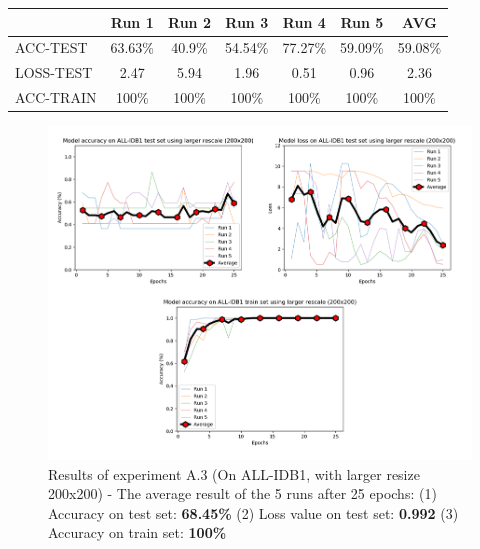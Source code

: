 \documentclass[11pt, openany]{report}
\theoremstyle{plain}
\theoremstyle{definition}
\theoremstyle{remark}
\begin{document}
\newpage
\begin{center}
\begin{tabular}{|l|c|c|c|c|c|c|}
  \hline
   & \textbf{Run 1} & \textbf{Run 2} & \textbf{Run 3} & \textbf{Run 4} & \textbf{Run 5} & \textbf{AVG}\\
  \hline
  ACC-TEST & 63.63\% & 40.9\% & 54.54\% & 77.27\% & 59.09\% & 59.08\%\\
  LOSS-TEST & 2.47 & 5.94 & 1.96 & 0.51  & 0.96 & 2.36 \\ 
  ACC-TRAIN & 100\% & 100\% & 100\% & 100\% & 100\% & 100\% \\ 
  \hline
\end{tabular}
\label{table:results-A3}
\end{center}

\begin{figure}[H]
  \centering
  \includegraphics[scale=0.5]{Code/ch6-LeukemiaSubtypes/figures_result/ALL_IDB1/all_idb1-200x200.PNG}
  \caption{Results of experiment A.3 (On ALL-IDB1, with larger resize 200x200) - The average result of the 5 runs after 25 epochs: (1) Accuracy on test set: \textbf{68.45\%} (2) Loss value on test set: \textbf{0.992} (3) Accuracy on train set: \textbf{100\%}}
  \label{fig:results-A3}
\end{figure}
\end{document}
